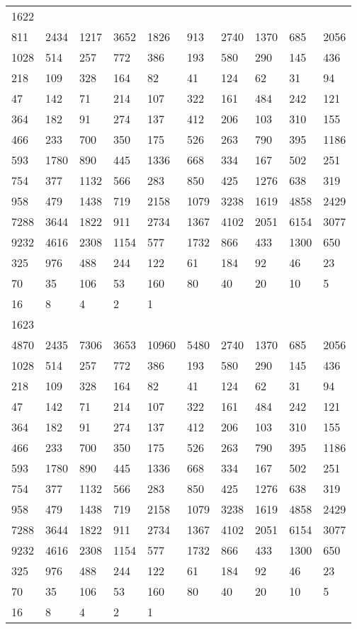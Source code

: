 \begin{longtable}{*{10}{l}}
1622&&&&&&&&&\\
811& 2434& 1217& 3652& 1826& 913& 2740& 1370& 685& 2056\\
1028& 514& 257& 772& 386& 193& 580& 290& 145& 436\\
218& 109& 328& 164& 82& 41& 124& 62& 31& 94\\
47& 142& 71& 214& 107& 322& 161& 484& 242& 121\\
364& 182& 91& 274& 137& 412& 206& 103& 310& 155\\
466& 233& 700& 350& 175& 526& 263& 790& 395& 1186\\
593& 1780& 890& 445& 1336& 668& 334& 167& 502& 251\\
754& 377& 1132& 566& 283& 850& 425& 1276& 638& 319\\
958& 479& 1438& 719& 2158& 1079& 3238& 1619& 4858& 2429\\
7288& 3644& 1822& 911& 2734& 1367& 4102& 2051& 6154& 3077\\
9232& 4616& 2308& 1154& 577& 1732& 866& 433& 1300& 650\\
325& 976& 488& 244& 122& 61& 184& 92& 46& 23\\
70& 35& 106& 53& 160& 80& 40& 20& 10& 5\\
16& 8& 4& 2& 1& \\

1623&&&&&&&&&\\
4870& 2435& 7306& 3653& 10960& 5480& 2740& 1370& 685& 2056\\
1028& 514& 257& 772& 386& 193& 580& 290& 145& 436\\
218& 109& 328& 164& 82& 41& 124& 62& 31& 94\\
47& 142& 71& 214& 107& 322& 161& 484& 242& 121\\
364& 182& 91& 274& 137& 412& 206& 103& 310& 155\\
466& 233& 700& 350& 175& 526& 263& 790& 395& 1186\\
593& 1780& 890& 445& 1336& 668& 334& 167& 502& 251\\
754& 377& 1132& 566& 283& 850& 425& 1276& 638& 319\\
958& 479& 1438& 719& 2158& 1079& 3238& 1619& 4858& 2429\\
7288& 3644& 1822& 911& 2734& 1367& 4102& 2051& 6154& 3077\\
9232& 4616& 2308& 1154& 577& 1732& 866& 433& 1300& 650\\
325& 976& 488& 244& 122& 61& 184& 92& 46& 23\\
70& 35& 106& 53& 160& 80& 40& 20& 10& 5\\
16& 8& 4& 2& 1& \\


\end{longtable}
